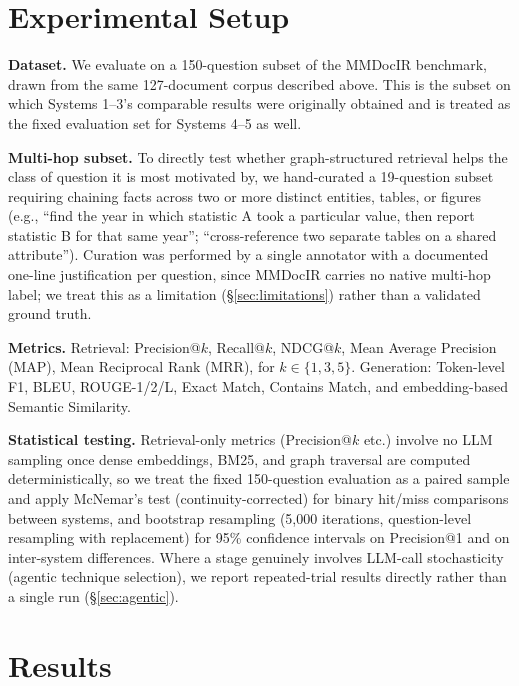 \documentclass[sigconf,anonymous,review]{acmart}
\begin{document}
\section{Experimental Setup}

\textbf{Dataset.} We evaluate on a 150-question subset of the MMDocIR benchmark, drawn from the same 127-document corpus described above. This is the subset on which Systems 1--3's comparable results were originally obtained and is treated as the fixed evaluation set for Systems 4--5 as well.

\textbf{Multi-hop subset.} To directly test whether graph-structured retrieval helps the class of question it is most motivated by, we hand-curated a 19-question subset requiring chaining facts across two or more distinct entities, tables, or figures (e.g., ``find the year in which statistic A took a particular value, then report statistic B for that same year''; ``cross-reference two separate tables on a shared attribute''). Curation was performed by a single annotator with a documented one-line justification per question, since MMDocIR carries no native multi-hop label; we treat this as a limitation (\S\ref{sec:limitations}) rather than a validated ground truth.

\textbf{Metrics.} Retrieval: Precision@$k$, Recall@$k$, NDCG@$k$, Mean Average Precision (MAP), Mean Reciprocal Rank (MRR), for $k \in \{1,3,5\}$. Generation: Token-level F1, BLEU, ROUGE-1/2/L, Exact Match, Contains Match, and embedding-based Semantic Similarity.

\textbf{Statistical testing.} Retrieval-only metrics (Precision@$k$ etc.) involve no LLM sampling once dense embeddings, BM25, and graph traversal are computed deterministically, so we treat the fixed 150-question evaluation as a paired sample and apply McNemar's test (continuity-corrected) for binary hit/miss comparisons between systems, and bootstrap resampling (5{,}000 iterations, question-level resampling with replacement) for 95\% confidence intervals on Precision@1 and on inter-system differences. Where a stage genuinely involves LLM-call stochasticity (agentic technique selection), we report repeated-trial results directly rather than a single run (\S\ref{sec:agentic}).

\section{Results}
\end{document}
